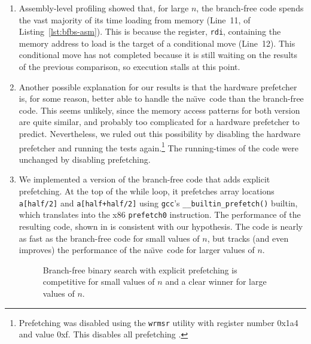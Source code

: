 \documentclass{patmorin}
\newcommand{\lstref}[1]{Listing~\ref{lst:#1}}
\newcommand{\naive}{na\"{\i}ve}
\begin{document}
\begin{enumerate}
\item Assembly-level profiling showed that, for large $n$, the
  branch-free code spends the vast majority of its time loading from
  memory (Line~11, of \lstref{bfbs-asm}).  This is because the register,
  \texttt{rdi},  containing the memory address to load is the
  target of a conditional move (Line~12).  This conditional move has not
  completed because it is still waiting on the results of the previous
  comparison, so execution stalls at this point.

\item Another possible explanation for our results is that the hardware
   prefetcher is, for some reason, better able to handle the \naive\
   code than the branch-free code.  This seems unlikely, since the memory
   access patterns for both version are quite similar, and probably too
   complicated for a hardware prefetcher to predict. Nevertheless, we
   ruled out this possibility by disabling the hardware prefetcher and
   running the tests again.\footnote{Prefetching was disabled using
   the \texttt{wrmsr} utility with register number 0x1a4 and value 0xf.  This disables all prefetching \cite{https://software.intel.com/en-us/articles/optimizing-application-performance-on-intel-coret-microarchitecture-using-hardware-implemented-prefetchers}.}    The running-times
   of the code were unchanged by disabling prefetching.

\item We implemented a version of the branch-free code that adds explicit
   prefetching. At the top of the while loop, it
   prefetches array locations \texttt{a[half/2]}
   and \texttt{a[half+half/2]} using \texttt{gcc}'s
   \texttt{__builtin_prefetch()} builtin, which translates into
   the x86 \texttt{prefetch0} instruction.  The performance of
   the resulting code, shown in  is consistent with our
   hypothesis.  The code is nearly as fast as the branch-free code for
   small values of $n$, but tracks (and even improves) the performance
   of the \naive\ code for larger values of $n$.

\begin{figure}
   \caption{Branch-free binary search with explicit prefetching is competitive
    for small values of $n$ and a clear winner for large values of $n$.}
   \figlabel{sorted-v}
\end{figure}


\end{enumerate}
\end{document}
